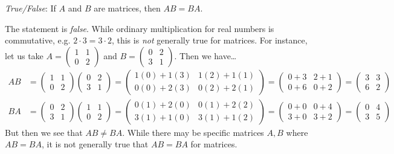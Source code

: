 \documentclass[11pt,letterpaper]{article}
\begin{document}
\quizsol \textit{True/False}: If $A$ and $B$ are matrices, then $AB= BA$. \pspace

\sol The statement is \textit{false}. While ordinary multiplication for real numbers is commutative, e.g. $2 \cdot 3= 3 \cdot 2$, this is \textit{not} generally true for matrices. For instance, let us take $A= \begin{pmatrix} 1 & 1 \\ 0 & 2 \end{pmatrix}$ and $B= \begin{pmatrix} 0 & 2 \\ 3 & 1 \end{pmatrix}$. Then we have\dots
	\[
	\begin{aligned}
	AB&= \begin{pmatrix} 1 & 1 \\ 0 & 2 \end{pmatrix} \begin{pmatrix} 0 & 2 \\ 3 & 1 \end{pmatrix}= \begin{pmatrix} 1(0) + 1(3) & 1(2) + 1(1) \\ 0(0) + 2(3) & 0(2) + 2(1) \end{pmatrix}= \begin{pmatrix} 0 + 3 & 2 + 1 \\ 0 + 6 & 0 + 2 \end{pmatrix}= \begin{pmatrix} 3 & 3 \\ 6 & 2 \end{pmatrix} \\[0.3cm]
	BA&= \begin{pmatrix} 0 & 2 \\ 3 & 1 \end{pmatrix} \begin{pmatrix} 1 & 1 \\ 0 & 2 \end{pmatrix}= \begin{pmatrix} 0(1) + 2(0) & 0(1) + 2(2) \\ 3(1) + 1(0) & 3(1) + 1(2) \end{pmatrix}= \begin{pmatrix} 0 + 0 & 0 + 4 \\ 3 + 0 & 3 + 2 \end{pmatrix}= \begin{pmatrix} 0 & 4 \\ 3 & 5 \end{pmatrix}
	\end{aligned}
	\] 
But then we see that $AB \neq BA$. While there may be specific matrices $A, B$ where $AB= BA$, it is not generally true that $AB= BA$ for matrices. \pvspace{0.8cm}
\end{document}
